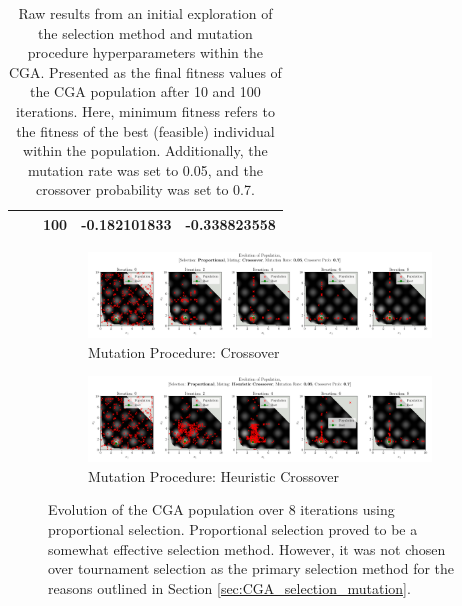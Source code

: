 \documentclass[10pt]{article}
\begin{document}
\begin{table}[H]
\begin{tabular}{|*{5}{c|}}
        & &\cellcolor{lightgray} 100 &\cellcolor{lightgray} -0.182101833 &\cellcolor{lightgray} -0.338823558 \\
        \hline
    \end{tabular}
    \captionsetup{justification=centering}
    \caption{Raw results from an initial exploration of the selection method and mutation procedure hyperparameters within the CGA. Presented as the final fitness values of the CGA population after 10 and 100 iterations. Here, minimum fitness refers to the fitness of the best (feasible) individual within the population. Additionally, the mutation rate was set to 0.05, and the crossover probability was set to 0.7.}
    \label{tab:CGAexploration}
\end{table}

\begin{figure}[H]
    \centering
    \begin{subfigure}{0.85\textwidth}
        \centering
        \includegraphics[width=\textwidth]{../figures/KBF/10_iters/Proportional/Crossover/0.05_0.7_Population.png}
        \caption{Mutation Procedure: Crossover}
        \label{fig:CGA_flowchart_proportional_crossover}
    \end{subfigure}
    \begin{subfigure}{0.85\textwidth}
        \centering
        \includegraphics[width=\textwidth]{../figures/KBF/10_iters/Proportional/Heuristic Crossover/0.05_0.7_Population.png}
        \caption{Mutation Procedure: Heuristic Crossover}
        \label{fig:CGA_flowchart_proportional_Heuristic Crossover}
    \end{subfigure}
    \captionsetup{justification=centering}
    \caption{Evolution of the CGA population over 8 iterations using proportional selection. Proportional selection proved to be a somewhat effective selection method. However, it was not chosen over tournament selection as the primary selection method for the reasons outlined in Section \ref{sec:CGA_selection_mutation}.}
    \label{fig:CGA_flowchart_proportional}
\end{figure}
\end{document}

